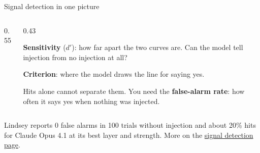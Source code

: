 \documentclass[aspectratio=169,11pt]{beamer}
\begin{document}
\begin{frame}[label=sdt]{Signal detection in one picture}
\begin{columns}[T]
\begin{column}{0.55\textwidth}
\end{column}
\begin{column}{0.43\textwidth}
{\small
\textbf{\textcolor{report}{Sensitivity}} ($d'$): how far apart the two curves are. Can the model tell injection from no injection at all?

\vspace{0.5em}
\textbf{\textcolor{bias}{Criterion}}: where the model draws the line for saying yes.

\vspace{0.5em}
Hits alone cannot separate them. You need the \textbf{false-alarm rate}: how often it says yes when nothing was injected.
}
\end{column}
\end{columns}

\vspace{0.4em}
{\footnotesize Lindsey reports 0 false alarms in 100 trials without injection and about 20\% hits for Claude Opus 4.1 at its best layer and strength. More on the \href{https://measuring-self-reports.github.io/measuring-self-reports/foundations/signal-detection/}{signal detection page}.}
\end{frame}
\end{document}

